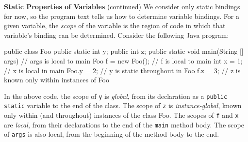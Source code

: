 \begin{minipage}[t]{\sw}
\slidenumber
\LARGE
{\bf Static Properties of Variables} (continued)\exx
We consider only static bindings for now,
so the program text tells us how to determine variable bindings.\exx
For a given variable, the {\em scope} of the variable is
the region of code in which that variable's binding can be determined.
Consider the following Java program:
\Large
\begin{qv}
public class Foo {
   public static int y;
   public int z;
   public static void main(String [] args) {
     // args is local to main
     Foo f = new Foo(); // f is local to main
     int x = 1; // x is local in main
     Foo.y = 2; // y is static throughout in Foo
     f.z = 3; // z is known only within instances of Foo
   }
}
\end{qv}
\LARGE
In the above code,
the scope of \verb'y' is {\em global},
from its declaration
as a \verb'public static' variable to the end of the class.
The scope of \verb'z' is {\em instance-global},
known only within (and throughout) instances of the class Foo.
The scopes of \verb'f' and \verb'x' are {\em local},
from their declarations to the end of the \verb'main' method body.
The scope of \verb'args' is also local,
from the beginning of the method body to the end.

\end{minipage}
\clearpage
